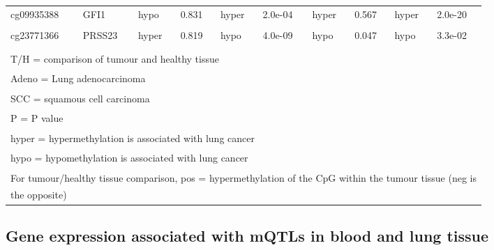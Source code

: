 \documentclass[11pt,twoside]{bristolthesis}
\begin{document}
\begin{table}[!h]
{\begin{tabular}[t]{llllllllll}
cg09935388 & GFI1 & hypo & 0.831 & hyper & 2.0e-04 & hyper & 0.567 & hyper & 2.0e-20\\
\addlinespace
\cellcolor{gray!6}{cg26963277} & \cellcolor{gray!6}{KCNQ1} & \cellcolor{gray!6}{hypo} & \cellcolor{gray!6}{0.299} & \cellcolor{gray!6}{hyper} & \cellcolor{gray!6}{3.6e-02} & \cellcolor{gray!6}{hypo} & \cellcolor{gray!6}{0.314} & \cellcolor{gray!6}{hyper} & \cellcolor{gray!6}{3.0e-03}\\
cg23771366 & PRSS23 & hyper & 0.819 & hypo & 4.0e-09 & hypo & 0.047 & hypo & 3.3e-02\\
\cellcolor{gray!6}{cg11660018} & \cellcolor{gray!6}{PRSS23} & \cellcolor{gray!6}{equal} & \cellcolor{gray!6}{0.999} & \cellcolor{gray!6}{hypo} & \cellcolor{gray!6}{3.0e-08} & \cellcolor{gray!6}{hypo} & \cellcolor{gray!6}{0.062} & \cellcolor{gray!6}{hypo} & \cellcolor{gray!6}{1.3e-01}\\
\bottomrule
\multicolumn{10}{l}{\textsuperscript{} T/H = comparison of tumour and healthy tissue}\\
\multicolumn{10}{l}{\textsuperscript{} Adeno = Lung adenocarcinoma}\\
\multicolumn{10}{l}{\textsuperscript{} SCC = squamous cell carcinoma}\\
\multicolumn{10}{l}{\textsuperscript{} P = P value}\\
\multicolumn{10}{l}{\textsuperscript{} hyper = hypermethylation is associated with lung cancer}\\
\multicolumn{10}{l}{\textsuperscript{} hypo = hypomethylation is associated with lung cancer}\\
\multicolumn{10}{l}{\textsuperscript{} For tumour/healthy tissue comparison, pos = hypermethylation of the CpG within the tumour tissue (neg is}\\
\multicolumn{10}{l}{the opposite)}\\
\end{tabular}}
\end{table}
\pagebreak

\hypertarget{gene-expression-associated-with-mqtls-in-blood-and-lung-tissue}{%
\subsection{Gene expression associated with mQTLs in blood and lung tissue}\label{gene-expression-associated-with-mqtls-in-blood-and-lung-tissue}}
\end{document}
